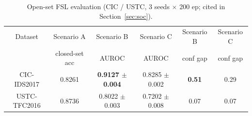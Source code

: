 \documentclass[sensors,article,submit,moreauthors]{Definitions/mdpi}
\begin{document}
\begin{table}[H]
\centering
\small
\caption{Open-set FSL evaluation (CIC / USTC, 3 seeds $\times$ 200 ep; cited in Section~\ref{sec:soc}).}
\label{tab:openset}
\setlength{\tabcolsep}{4pt}
\begin{tabular}{cccccc}
\toprule
Dataset & Scenario A & Scenario B & Scenario C & Scenario B & Scenario C \\
 & closed-set acc & AUROC & AUROC & conf gap & conf gap \\
\midrule
CIC-IDS2017  & 0.8261 & \textbf{0.9127 $\pm$ 0.004} & 0.8285 $\pm$ 0.002 & \textbf{0.51} & 0.29 \\
USTC-TFC2016 & 0.8736 & 0.8022 $\pm$ 0.003 & 0.7202 $\pm$ 0.008 & 0.07 & 0.07 \\
\bottomrule
\end{tabular}
\end{table}
\end{document}
